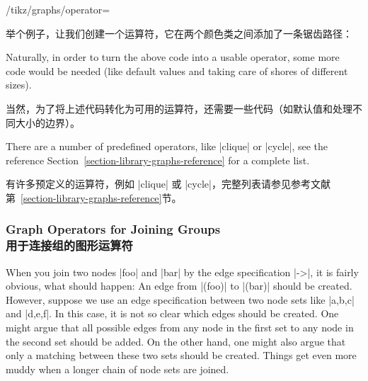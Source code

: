 \begin{key}{/tikz/graphs/operator=}
\begin{command}{\tikzgraphpreparecolor{}}
        举个例子，让我们创建一个运算符，它在两个颜色类之间添加了一条锯齿路径：
\begin{codeexample}[preamble={\usetikzlibrary{graphs}}]
\newcount\leftshorecount   \newcount\rightshorecount
\newcount\mycount          \newcount\myothercount
\def\zigzag{
  \tikzgraphpreparecolor{left shore}\leftshorecount{left shore prefix}
  \tikzgraphpreparecolor{right shore}\rightshorecount{right shore prefix}
  \mycount=0\relax
  \loop
    \advance\mycount by 1\relax%
    \tikzgraphsset{new ->=
      {\csname left shore prefix\the\mycount\endcsname}
      {\csname right shore prefix\the\mycount\endcsname}{}{}}
    \myothercount=\mycount\relax%
    \advance\myothercount by1\relax%
    \tikzgraphsset{new <-=
      {\csname left shore prefix\the\myothercount\endcsname}
      {\csname right shore prefix\the\mycount\endcsname}{}{}}
  \ifnum\myothercount<\leftshorecount\relax
  \repeat
}
\end{codeexample}
        Naturally, in order to turn the above code into a usable operator, some
        more code would be needed (like default values and taking care of
        shores of different sizes).

        当然，为了将上述代码转化为可用的运算符，还需要一些代码（如默认值和处理不同大小的边界）。
    \end{command}
\end{key}

There are a number of predefined operators, like |clique| or |cycle|, see the
reference Section~\ref{section-library-graphs-reference} for a complete list.

有许多预定义的运算符，例如 |clique| 或 |cycle|，完整列表请参见参考文献第~\ref{section-library-graphs-reference}节。

\subsubsection{Graph Operators for Joining Groups\\用于连接组的图形运算符}
\label{section-library-graphs-join}

When you join two nodes |foo| and |bar| by the edge specification |->|, it is
fairly obvious, what should happen: An edge from |(foo)| to |(bar)| should be
created. However, suppose we use an edge specification between two node sets
like |{a,b,c}| and |{d,e,f}|. In this case, it is not so clear which edges
should be created. One might argue that all possible edges from any node in the
first set to any node in the second set should be added. On the other hand, one
might also argue that only a matching between these two sets should be created.
Things get even more muddy when a longer chain of node sets are joined.

